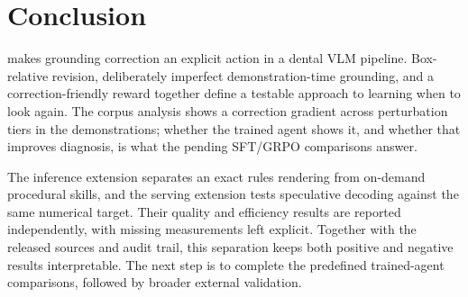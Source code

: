 \section{Conclusion}
\label{sec:conclusion}

\sys{} makes grounding correction an explicit action in a dental VLM pipeline. Box-relative
revision, deliberately imperfect demonstration-time grounding, and a correction-friendly reward
together define a testable approach to learning when to look again. The corpus analysis shows a
correction gradient across perturbation tiers in the demonstrations; whether the trained agent shows it, and
whether that improves diagnosis, is what the pending SFT/GRPO comparisons answer.

The inference extension separates an exact rules rendering from on-demand procedural skills,
and the serving extension tests speculative decoding against the same numerical target. Their
quality and efficiency results are reported independently, with missing measurements left
explicit. Together with the released sources and audit trail, this separation keeps both
positive and negative results interpretable. The next step is to complete the predefined
trained-agent comparisons, followed by broader external validation.

